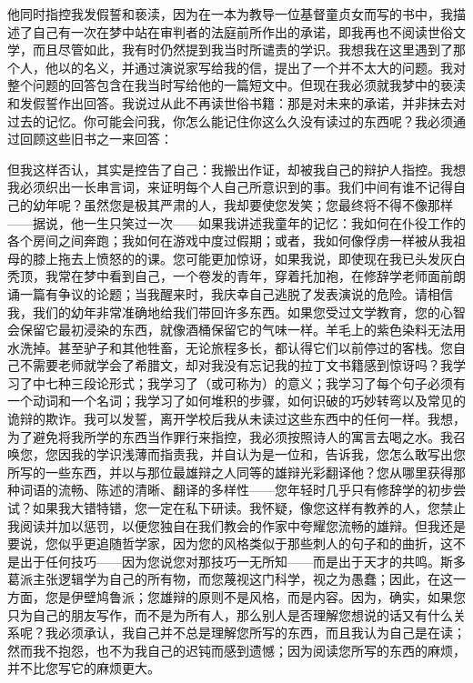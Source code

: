 他同时指控我发假誓和亵渎，因为在一本为教导一位基督童贞女而写的书中，我描述了自己有一次在梦中站在审判者的法庭前所作出的承诺，即我再也不阅读世俗文学，而且尽管如此，我有时仍然提到我当时所谴责的学识。我想我在这里遇到了那个人，他以的名义，并通过演说家写给我的信，提出了一个并不太大的问题。我对整个问题的回答包含在我当时写给他的一篇短文中。但现在我必须就我梦中的亵渎和发假誓作出回答。我说过从此不再读世俗书籍：那是对未来的承诺，并非抹去对过去的记忆。你可能会问我，你怎么能记住你这么久没有读过的东西呢？我必须通过回顾这些旧书之一来回答：\par

\par

但我这样否认，其实是控告了自己：我搬出作证，却被我自己的辩护人指控。我想我必须织出一长串言词，来证明每个人自己所意识到的事。我们中间有谁不记得自己的幼年呢？虽然您是极其严肃的人，我却要使您发笑；您最终将不得不像那样——据说，他一生只笑过一次——如果我讲述我童年的记忆：我如何在仆役工作的各个房间之间奔跑；我如何在游戏中度过假期；或者，我如何像俘虏一样被从我祖母的膝上拖去上愤怒的的课。您可能更加惊讶，如果我说，即使现在我已头发灰白秃顶，我常在梦中看到自己，一个卷发的青年，穿着托加袍，在修辞学老师面前朗诵一篇有争议的论题；当我醒来时，我庆幸自己逃脱了发表演说的危险。请相信我，我们的幼年非常准确地给我们带回许多东西。如果您受过文学教育，您的心智会保留它最初浸染的东西，就像酒桶保留它的气味一样。羊毛上的紫色染料无法用水洗掉。甚至驴子和其他牲畜，无论旅程多长，都认得它们以前停过的客栈。您自己不需要老师就学会了希腊文，却对我没有忘记我的拉丁文书籍感到惊讶吗？我学习了中七种三段论形式；我学习了（或可称为）的意义；我学习了每个句子必须有一个动词和一个名词；我学习了如何堆积的步骤，如何识破的巧妙转弯以及常见的诡辩的欺诈。我可以发誓，离开学校后我从未读过这些东西中的任何一样。我想，为了避免将我所学的东西当作罪行来指控，我必须按照诗人的寓言去喝之水。我召唤您，您因我的学识浅薄而指责我，并自认为是一位和，告诉我，您怎么敢写出您所写的一些东西，并以与那位最雄辩之人同等的雄辩光彩翻译他？您从哪里获得那种词语的流畅、陈述的清晰、翻译的多样性——您年轻时几乎只有修辞学的初步尝试？如果我大错特错，您一定在私下研读。我怀疑，像您这样有教养的人，您禁止我阅读并加以惩罚，以便您独自在我们教会的作家中夸耀您流畅的雄辩。但我还是要说，您似乎更追随哲学家，因为您的风格类似于那些刺人的句子和的曲折，这不是出于任何技巧——因为您说您对那技巧一无所知——而是出于天才的共鸣。斯多葛派主张逻辑学为自己的所有物，而您蔑视这门科学，视之为愚蠢；因此，在这一方面，您是伊壁鸠鲁派；您雄辩的原则不是风格，而是内容。因为，确实，如果您只为自己的朋友写作，而不是为所有人，那么别人是否理解您想说的话又有什么关系呢？我必须承认，我自己并不总是理解您所写的东西，而且我认为自己是在读；然而我不抱怨，也不为我自己的迟钝而感到遗憾；因为阅读您所写的东西的麻烦，并不比您写它的麻烦更大。\par

